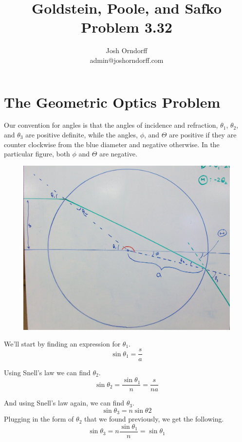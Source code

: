 \documentclass[10pt,a4paper]{article}
\begin{document}
\title{Goldstein, Poole, and Safko Problem 3.32}
\author{Josh Orndorff \\ admin@joshorndorff.com}
\maketitle

\section{The Geometric Optics Problem}
Our convention for angles is that the angles of incidence and refraction, $\theta_1$, $\theta_2$, and $\theta_3$ are positive definite, while the angles, $\phi$, and $\Theta$ are positive if they are counter clockwise from the blue diameter and negative otherwise.  In the particular figure, both $\phi$ and $\Theta$ are negative.

\begin{figure}
\includegraphics[scale=1]{Goldstein3-32.jpg}
\end{figure}

We'll start by finding an expression for $\theta_1$.
\begin{equation}
\sin\theta_1=\frac{s}{a}
\end{equation}

Using Snell's law we can find $\theta_2$.
\begin{equation}
\sin\theta_2=\frac{\sin\theta_1}{n}=\frac{s}{na}
\end{equation}

And using Snell's law again, we can find $\theta_3$.
\begin{equation}
\sin\theta_3=n\sin\theta2
\end{equation}
Plugging in the form of $\theta_2$ that we found previously, we get the following.
\begin{equation}
\sin\theta_3=n\frac{\sin\theta_1}{n}=\sin\theta_1
\end{equation}
\end{document}
